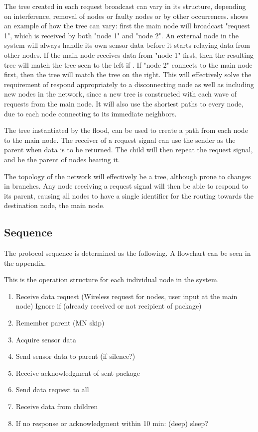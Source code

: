 The tree created in each request broadcast can vary in its structure, depending on interference, removal of nodes or faulty nodes or by other occurrences.  shows an example of how the tree can vary: first the main node will broadcast "request 1", which is received by both "node 1" and "node 2". An external node in the system will always handle its own sensor data before it starts relaying data from other nodes. If the main node receives data from "node 1" first, then the resulting tree will match the tree seen to the left if . If "node 2" connects to the main node first, then the tree will match the tree on the right.
This will effectively solve the requirement of respond appropriately to a disconnecting node as well as including new nodes in the network, since a new tree is constructed with each wave of requests from the main node.
It will also use the shortest paths to every node, due to each node connecting to its immediate neighbors.

The tree instantiated by the flood, can be used to create a path from each node to the main node.
The receiver of a request signal can use the sender as the parent when data is to be returned.
The child will then repeat the request signal, and be the parent of nodes hearing it.

The topology of the network will effectively be a tree, although prone to changes in branches.
Any node receiving a request signal will then be able to respond to its parent, causing all nodes to have a single identifier for the routing towards the destination node, the main node.

\subsection{Sequence}
The protocol sequence is determined as the following. A flowchart can be seen in the appendix.

This is the operation structure for each individual node in the system.
\begin{enumerate}
	\item Receive data request (Wireless request for nodes, user input at the main node)
	\subitem Ignore if (already received or not recipient of package)
	\item Remember parent (MN skip)
	\item Acquire sensor data
	\item Send sensor data to parent (if silence?)
	\item Receive acknowledgment of sent package
	\item Send data request to all
	\item Receive data from children
	\item If no response or acknowledgment within 10 min: (deep) sleep?
\end{enumerate}

